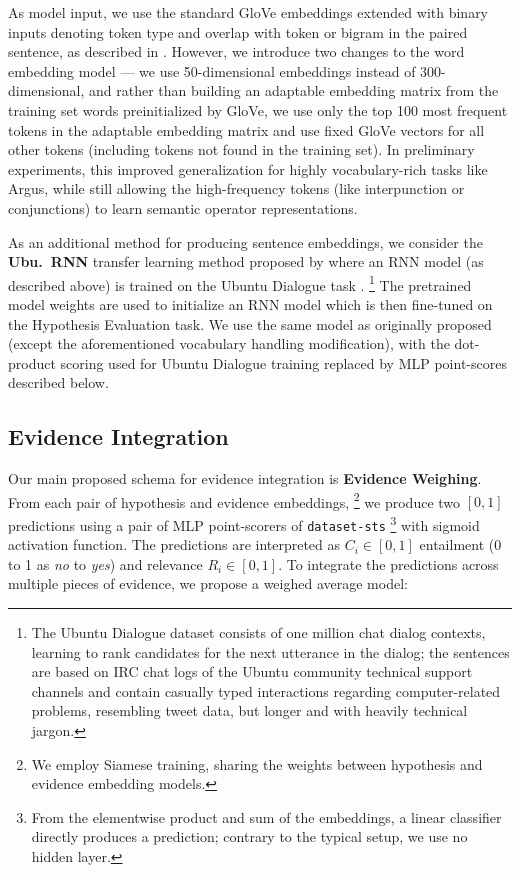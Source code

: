 \documentclass[11pt]{article}
\begin{document}
As model input, we use the standard GloVe embeddings \cite{GloVe}
extended with binary inputs denoting token type and overlap with token or bigram in the paired sentence,
as described in \cite{sps}.
However, we introduce two changes to the word
embedding model --- we use 50-dimensional embeddings instead of 300-dimensional,
and rather than building an adaptable embedding matrix from the
training set words preinitialized by GloVe, we use only the top 100
most frequent tokens in the adaptable embedding matrix and use
fixed GloVe vectors for all other tokens (including tokens not
found in the training set).  In preliminary experiments, this improved generalization
for highly vocabulary-rich tasks like Argus, while still allowing the high-frequency
tokens (like interpunction or conjunctions) to learn semantic operator representations.

As an additional method for producing sentence embeddings, we consider
the \textbf{Ubu.\ RNN} transfer learning method proposed by \cite{sps} where an RNN model
(as described above) is trained on the Ubuntu Dialogue task \cite{UbuntuLowe}.%
\footnote{The Ubuntu Dialogue dataset consists of one million chat dialog contexts,
learning to rank candidates for the next utterance in the dialog;
the sentences are based on IRC chat logs of the Ubuntu
community technical support channels and contain casually typed interactions regarding
computer-related problems, resembling tweet data, but longer and with heavily technical jargon.}
The pretrained model weights are used to initialize an RNN model which is then fine-tuned
on the Hypothesis Evaluation task.  We use the same model as originally proposed (except the aforementioned vocabulary handling modification),
with the dot-product scoring used for Ubuntu Dialogue training replaced by MLP point-scores described below.

\subsection{Evidence Integration}

Our main proposed schema for evidence integration is \textbf{Evidence Weighing}.
From each pair of hypothesis and evidence embeddings,%
\footnote{We employ Siamese training, sharing the weights between hypothesis and evidence embedding models.}
we produce two $[0,1]$
predictions using a pair of MLP point-scorers of \texttt{dataset-sts} \cite{sps}%
\footnote{From the elementwise product
and sum of the embeddings, a linear classifier directly produces a prediction;
contrary to the typical setup, we use no hidden layer.}
with sigmoid activation function.  The predictions are interpreted as $C_i \in [0,1]$
entailment (0 to 1 as \textit{no} to \textit{yes}) and relevance $R_i \in [0,1]$.
To integrate the predictions across multiple pieces of evidence,
we propose a weighed average model:
\end{document}
